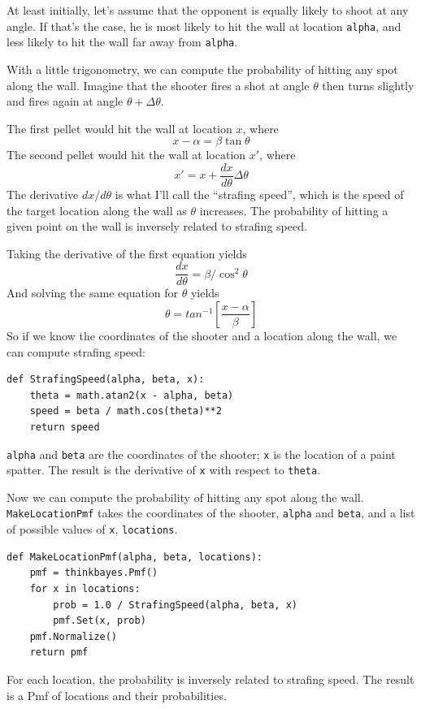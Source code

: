 \documentclass[12pt]{book}
\begin{document}
At least initially, let's assume that the opponent is equally likely
to shoot at any angle.  If that's the case, he is most likely to hit
the wall at location {\tt alpha}, and less likely to hit the wall far
away from {\tt alpha}.

With a little trigonometry, we can compute the probability of hitting
any spot along the wall.  Imagine that the shooter fires a shot at
angle $\theta$ then turns slightly and fires again at angle $\theta +
\Delta\theta$.

The first pellet would hit the wall at location $x$, where
%
\[ x - \alpha = \beta \tan \theta \]
%
The second pellet would hit the wall at location $x'$, where
%
\[ x' = x + \frac{dx}{d\theta} \Delta\theta \]
%
The derivative $dx/d\theta$ is what I'll call the ``strafing speed'',
which is the speed of the target location along the wall as $\theta$
increases.  The probability of hitting a given point on the wall is
inversely related to strafing speed.

Taking the derivative of the first equation yields
%
\[ \frac{dx}{d\theta} = \beta / \cos^2 \theta \]
%
And solving the same equation for $\theta$ yields
%
\[ \theta = tan^{-1} \left[ \frac{x - \alpha}{\beta} \right] \]
%
So if we know the coordinates of the shooter and a location 
along the wall, we can compute strafing speed:

\begin{verbatim}
def StrafingSpeed(alpha, beta, x):
    theta = math.atan2(x - alpha, beta)
    speed = beta / math.cos(theta)**2
    return speed
\end{verbatim}

{\tt alpha} and {\tt beta} are the coordinates of the shooter;
{\tt x} is the location of a paint spatter.  The result is
the derivative of {\tt x} with respect to {\tt theta}.

Now we can compute the probability of hitting any spot along
the wall.  {\tt MakeLocationPmf} takes the coordinates of
the shooter, {\tt alpha} and {\tt beta}, and a list of possible
values of {\tt x}, {\tt locations}.

\begin{verbatim}
def MakeLocationPmf(alpha, beta, locations):
    pmf = thinkbayes.Pmf()
    for x in locations:
        prob = 1.0 / StrafingSpeed(alpha, beta, x)
        pmf.Set(x, prob)
    pmf.Normalize()
    return pmf
\end{verbatim}

For each location, the probability is inversely related to
strafing speed.  The result is a Pmf of locations and their
probabilities.
\end{document}
